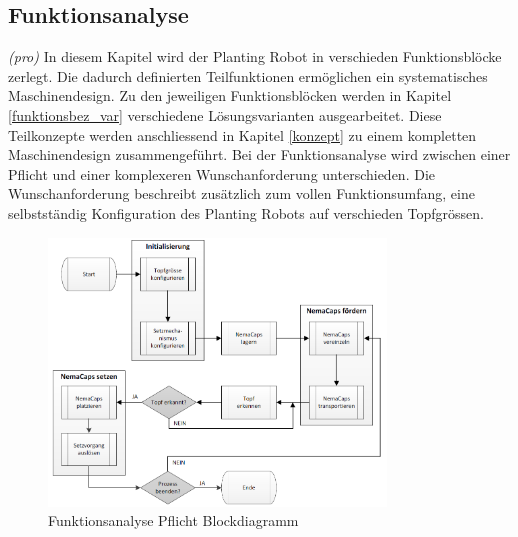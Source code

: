 \subsection{Funktionsanalyse}

\textit{(pro)} In diesem Kapitel wird der Planting Robot in verschieden Funktionsblöcke zerlegt. Die dadurch definierten Teilfunktionen ermöglichen ein systematisches Maschinendesign. Zu den jeweiligen Funktionsblöcken werden in Kapitel \ref{funktionsbez_var} verschiedene Lösungsvarianten ausgearbeitet. Diese Teilkonzepte werden anschliessend in Kapitel \ref{konzept} zu einem kompletten Maschinendesign zusammengeführt.\newline
Bei der Funktionsanalyse wird zwischen einer Pflicht und einer komplexeren Wunschanforderung unterschieden. Die Wunschanforderung beschreibt zusätzlich zum vollen Funktionsumfang, eine selbstständig Konfiguration des Planting Robots auf verschieden Topfgrössen.


\begin{figure}[H]
	\includegraphics[width=0.8\textwidth]{Illustrationen/4-Entwurf/Funktionsanalyse_Pflicht.png}
	\caption{Funktionsanalyse Pflicht Blockdiagramm}
	\label{fig:FunktPflicht}
\end{figure}


